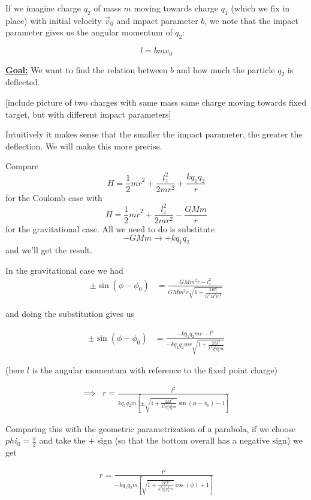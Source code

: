 \documentclass[11pt]{article}
\begin{document}
\vskip 0.5cm
If we imagine charge $q_2$ of mass $m$ moving towards charge $q_1$ (which we fix in place) with initial velocity $\vec{v}_0$ and impact parameter $b$, we note that the impact parameter gives us the angular momentum of $q_2$:

\[ l = bmv_0 \]

\vskip 0.5cm
\textbf{\underline{Goal:}} We want to find the relation between $b$ and how much the particle $q_2$ is deflected.

\vskip 0.5cm
[include picture of two charges with same mass same charge moving towards fixed target, but with different impact parameters]

\vskip 0.5cm
Intuitively it makes sense that the smaller the impact parameter, the greater the deflection. We will make this more precise.

\vskip 0.5cm
Compare \[H = \frac{1}{2} m \dot{r}^2 + \frac{l_z^2}{2mr^2} + \frac{k q_1 q_2}{r}\] for the Coulomb case with \[ H = \frac{1}{2} m \dot{r}^2 + \frac{l_z^2}{2m r^2} - \frac{GMm}{r} \] for the gravitational case. All we need to do is substitute 
\[ - GMm \rightarrow + kq_1 q_2 \] and we'll get the result.

\vskip 0.5cm
In the gravitational case we had 
\begin{align*}
  \pm \sin(\phi - \phi_0) &= \frac{GMm^2 r - l_z^2}{GMm^2 r \sqrt{1 + \frac{2E l_z^2}{G^2 M^2 m^2}}} 
\end{align*}

and doing the substitution gives us 

\begin{align*}
  \pm \sin(\phi - \phi_0) &= \frac{-kq_1 q_2 m r - l^2}{-kq_1 q_2 mr \sqrt{1 + \frac{2El^2}{k^2 q_1^2 q_2^2 m}}}
\end{align*}

(here $l$ is the angular momentum with reference to the fixed point charge)

\begin{align*}
  \implies& r = \frac{l^2}{kq_1 q_2 m \left[ \pm \sqrt{1 + \frac{2El^2}{k^2 q_1^2 q_2^2 m}} \sin(\phi - \phi_0) - 1 \right]}
\end{align*}

Comparing this with the geometric parametrization of a parabola, if we choose $phi_0 = \frac{\pi}{2}$ and take the $+$ sign (so that the bottom overall has a negative sign) we get 

\begin{align*}
  r = \frac{l^2}{-k q_1 q_2 m \left[ \sqrt{1 + \frac{2E l^2}{k^2 q_1^2 q_2^2 m}} \cos(\phi) + 1 \right]}
\end{align*}
\end{document}
